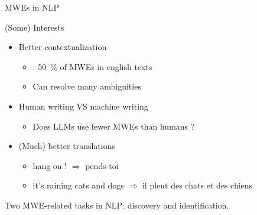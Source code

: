 \documentclass[serif, aspectratio=169]{beamer}
\begin{document}
\begin{frame}{MWEs in NLP}
    \begin{block}{(Some) Interests}
        \begin{itemize}
            \pause
            \item Better contextualization 
            \begin{itemize}
                \item \citet{jackendoff1997architecture}: 50~\% of MWEs in english texts
                \item Can resolve many ambiguities
            \end{itemize}
            \vspace{10pt}
            \pause
            \item Human writing VS machine writing
            \begin{itemize}
                \item Does LLMs use fewer MWEs than humans ?
            \end{itemize}
            \vspace{10pt}
            \pause
            \item (Much) better translations
            \begin{itemize}
                \item hang on ! $\Rightarrow$ pends-toi
                \item it's raining cats and dogs $\Rightarrow$ il pleut des chats et des chiens
            \end{itemize}
        \end{itemize}
    \end{block}
    \vfill
    \pause
    \begin{center}
        \Large
        Two MWE-related tasks in NLP: discovery and identification.
    \end{center}
\end{frame}
\end{document}
